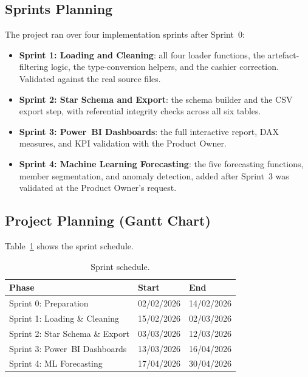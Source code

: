 \documentclass[12pt, a4paper]{report}
\begin{document}
\subsection{Sprints Planning}

The project ran over four implementation sprints after Sprint~0:

\begin{itemize}
  \item \textbf{Sprint 1: Loading and Cleaning}: all four loader functions,
        the artefact-filtering logic, the type-conversion helpers, and the cashier
        correction. Validated against the real source files.
  \item \textbf{Sprint 2: Star Schema and Export}: the schema builder and the
        CSV export step, with referential integrity checks across all six tables.
  \item \textbf{Sprint 3: Power~BI Dashboards}: the full interactive report,
        DAX measures, and KPI validation with the Product Owner.
  \item \textbf{Sprint 4: Machine Learning Forecasting}: the five forecasting
        functions, member segmentation, and anomaly detection, added after
        Sprint~3 was validated at the Product Owner's request.
\end{itemize}

\subsection{Project Planning (Gantt Chart)}

Table~\ref{tab:planning} shows the sprint schedule.

\begin{table}[H]
  \centering
  \caption{Sprint schedule.\label{tab:planning}}
  \begin{tabular}{lll}
    \toprule
    \textbf{Phase}  & \textbf{Start} & \textbf{End} \\
    \midrule
    Sprint 0: Preparation           & 02/02/2026 & 14/02/2026 \\
    Sprint 1: Loading \& Cleaning   & 15/02/2026 & 02/03/2026 \\
    Sprint 2: Star Schema \& Export & 03/03/2026 & 12/03/2026 \\
    Sprint 3: Power~BI Dashboards   & 13/03/2026 & 16/04/2026 \\
    Sprint 4: ML Forecasting        & 17/04/2026 & 30/04/2026 \\
    \bottomrule
  \end{tabular}
\end{table}
\end{document}

